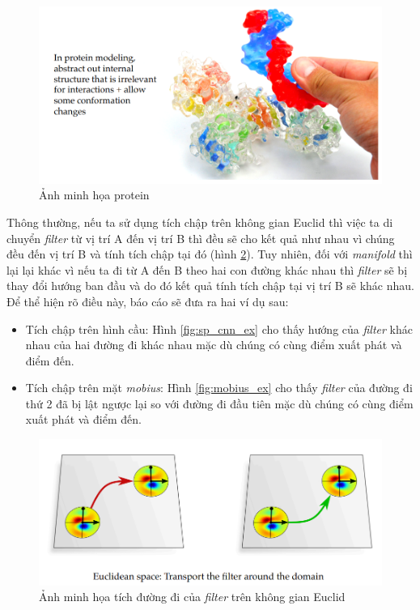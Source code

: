 \begin{figure}[H]
    \centering
    \includegraphics[width=0.85\linewidth]{Images/GDL/manifold_mesh/protein.png}
    \caption{Ảnh minh họa protein\cite{geometricdeep2022}}
    \label{fig:protein}
\end{figure}

Thông thường, nếu ta sử dụng tích chập trên không gian Euclid thì việc ta di chuyển \textit{filter} từ vị trí A đến vị trí B thì đều sẽ cho kết quả như nhau vì chúng đều đến vị trí B và tính tích chập tại đó (hình \ref{fig:ecnn}). Tuy nhiên, đối với \textit{manifold} thì lại lại khác vì nếu ta đi từ A đến B theo hai con đường khác nhau thì \textit{filter} sẽ bị thay đổi hướng ban đầu và do đó kết quả tính tích chập tại vị trí B sẽ khác nhau. Để thể hiện rõ điều này, báo cáo sẽ đưa ra hai ví dụ sau:
\begin{itemize}
    \item Tích chập trên hình cầu: Hình \ref{fig:sp_cnn_ex} cho thấy hướng của \textit{filter} khác nhau của hai đường đi khác nhau mặc dù chúng có cùng điểm xuất phát và điểm đến.

    \item Tích chập trên mặt \textit{mobius}: Hình \ref{fig:mobius_ex} cho thấy \textit{filter} của đường đi thứ 2 đã bị lật ngược lại so với đường đi đầu tiên mặc dù chúng có cùng điểm xuất phát và điểm đến.
\end{itemize}

\begin{figure}[H]
    \centering
    \includegraphics[width=1\linewidth]{Images/GDL/manifold_mesh/E_CNN.png}
    \caption{Ảnh minh họa tích đường đi của \textit{filter} trên không gian Euclid\cite{geometricdeep2022}}
    \label{fig:ecnn}
\end{figure}

